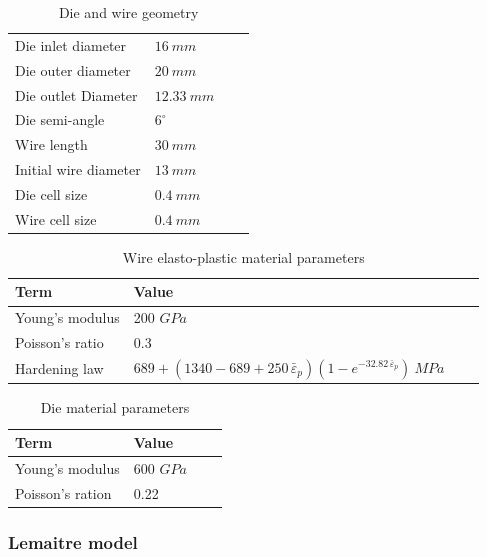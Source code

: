 \documentclass[sn-mathphys,Numbered,draft]{sn-jnl}%
\begin{document}
\begin{table}[htb]
	\centering
		\begin{tabular}{llll} \hline
		    Die inlet diameter & $16\ mm$ \\
		    Die outer diameter & $20\ mm$ \\
      	Die outlet Diameter & $12.33\ mm$ \\
            Die semi-angle &  $6^{\circ}$ \\
		    Wire length & $30\ mm$ \\
		    Initial wire diameter & $13\ mm$ \\
      	Die cell size & $0.4\ mm$ \\
            Wire cell size & $0.4\ mm$ \\
			\hline
		\end{tabular}
	\caption{Die and wire geometry}
	\label{tab:material_properties}
\end{table}


\begin{table}[htb]
	\centering
		\begin{tabular}{llll} \hline
			Term  & Value  \\ \hline 
            Young's modulus & 200 $GPa$ \\
			Poisson's ratio & 0.3  \\
   		Hardening law & $689+(1340-689+250\,\bar{\varepsilon}_p)(1-e^{-32.82\,\bar{\varepsilon}_p})\ MPa$ &  \\
			\hline
		\end{tabular}
	\caption{Wire elasto-plastic material parameters}
	\label{tab:material_properties}
\end{table}

\begin{table}[htb]
	\centering
		\begin{tabular}{llll} \hline
			Term  & Value  \\ \hline 
            Young's modulus & 600 $GPa$ \\
			Poisson's ration & 0.22  \\
			\hline
		\end{tabular}
	\caption{Die material parameters}
	\label{tab:material_properties}
\end{table}


\FloatBarrier

\subsubsection{Lemaitre model}
\end{document}
